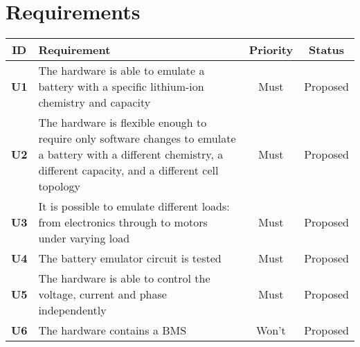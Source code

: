 \newpage
\section{Requirements}
\begin{longtable}{|c|p{10cm}|c|c|}
    \hline
    \textbf{ID} & \textbf{Requirement} & \textbf{Priority} & \textbf{Status}\\ \hline 
    \textbf{U1} & The hardware is able to emulate a battery with a specific lithium-ion chemistry and capacity & Must & Proposed\\ \hline
    \textbf{U2} & The hardware is flexible enough to require only software changes to emulate a battery with a different chemistry, a different capacity, and a different cell topology & Must & Proposed\\ \hline
    \textbf{U3} & It is possible to emulate different loads: from electronics through to motors under varying load & Must & Proposed\\ \hline
    \textbf{U4} & The battery emulator circuit is tested & Must & Proposed\\ \hline
    \textbf{U5} & The hardware is able to control the voltage, current and phase independently & Must & Proposed\\ \hline
    \textbf{U6} & The hardware contains a BMS & Won't & Proposed\\ \hline
\end{longtable}